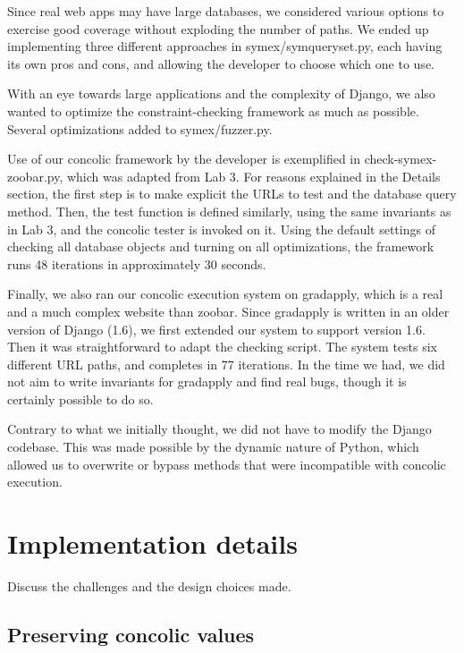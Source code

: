 \documentclass{scrartcl}
\begin{document}
Since real web apps may have large databases, we considered various
options to exercise good coverage without exploding the number of
paths. We ended up implementing three different approaches in
symex/symqueryset.py, each having its own pros and cons, and allowing
the developer to choose which one to use.

With an eye towards large applications and the complexity of Django,
we also wanted to optimize the constraint-checking framework as much
as possible. Several optimizations added to symex/fuzzer.py.

Use of our concolic framework by the developer is exemplified in
check-symex-zoobar.py, which was adapted from Lab 3. For reasons
explained in the Details section, the first step is to make explicit
the URLs to test and the database query method. Then, the test
function is defined similarly, using the same invariants as in Lab 3,
and the concolic tester is invoked on it. Using the default settings
of checking all database objects and turning on all optimizations, the
framework runs 48 iterations in approximately 30 seconds.

Finally, we also ran our concolic execution system on gradapply, which
is a real and a much complex website than zoobar. Since gradapply is
written in an older version of Django (1.6), we first extended our
system to support version 1.6. Then it was straightforward to adapt
the checking script. The system tests six different URL paths, and
completes in 77 iterations. In the time we had, we did not aim to
write invariants for gradapply and find real bugs, though it is
certainly possible to do so.

Contrary to what we initially thought, we did not have to modify the
Django codebase. This was made possible by the dynamic nature of
Python, which allowed us to overwrite or bypass methods that were
incompatible with concolic execution.


\section{Implementation details}

Discuss the challenges and the design choices made.

\subsection{Preserving concolic values}
\end{document}
